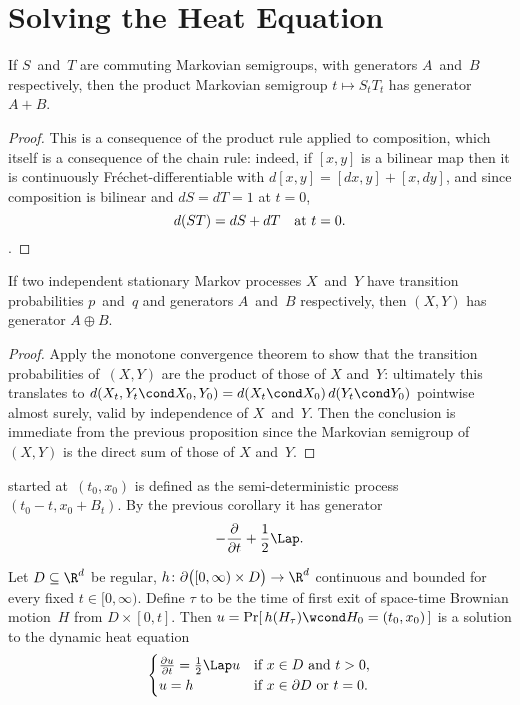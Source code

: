 \section	{Solving the Heat Equation}

\begin	{proposition}
If $S$~and~$T$ are commuting Markovian semigroups,
with generators $A$~and~$B$ respectively,
then the product Markovian semigroup \( t \mapsto S_t T_t \)
has generator \( A + B \).
\end	{proposition}
\begin	{proof}
This is a consequence of the product rule applied to composition,
which itself is a consequence of the chain rule:
indeed, if $[x,y]$ is a bilinear map
then it is continuously Fréchet-differentiable with
\( d[x,y] = [dx,y] + [x,dy] \),
and since composition is bilinear and \( dS = dT = 1 \) at \( t = 0 \),
\[ d(ST) = dS + dT \quad \text{at \( t = 0 \).} \qedhere \].
\end	{proof}

\begin	{corollary}
If two independent stationary Markov processes $X$~and~$Y$
have transition probabilities $p$~and~$q$
and generators $A$~and~$B$ respectively,
then $(X,Y)$ has generator \( A \oplus B \).
\end	{corollary}
\begin	{proof}
Apply the monotone convergence theorem
to show that the transition probabilities of~$(X,Y)$
are the product of those of $X$ and~$Y$:
ultimately this translates to
\( d(X_t,Y_t\cond X_0,Y_0) = d(X_t\cond X_0) \, d(Y_t\cond Y_0) \)
pointwise almost surely,
valid by independence of $X$~and~$Y$.
Then the conclusion is immediate from the previous proposition
since the Markovian semigroup of~$(X,Y)$ is the direct sum
of those of $X$ and~$Y$.
\end	{proof}

\begin	{definition}
 started at~$(t_0,x_0)$
is defined as the semi-deterministic process \( (t_0-t,x_0+B_t) \).
By the previous corollary it has generator
\[ -\frac{\partial}{\partial t} + \frac12 \Lap \text. \]
\end	{definition}

\begin	{theorem}
Let \( D \subseteq \R^d \) be regular,
\( h \colon \partial \bigl( [0,\infty) \times D \bigr) \to \R^d \)
continuous and bounded for every fixed \( t \in [0,\infty) \).
Define $\tau$ to be the time of first exit
of space-time Brownian motion~$H$ from \( D \times [0,t] \).
Then \( u = \Pr[\, h(H_\tau) \wcond H_0 = (t_0,x_0) \,] \)
is a solution to the dynamic heat equation
\begin	{equation}
\label	{eq:dynamic-heat}
\begin	{cases}
	\frac{\partial u}{\partial t} = \frac12 \Lap u
		& \text{if \( x \in D \) and \( t > 0 \),} \\
	u = h & \text{if \( x \in \partial D \) or \( t = 0 \).}
\end	{cases}
\end	{equation}
\end	{theorem}
